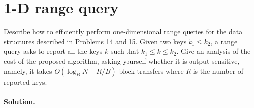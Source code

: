 \section{1-D range query}
Describe how to efficiently perform one-dimensional range queries for the data structures described in Problems 14 and 15. Given two keys $k_1 \leq k_2$, a range query asks to report all the keys $k$ such that $k_1 \leq k \leq k_2$. Give an analysis of the cost of the proposed algorithm, asking yourself whether it is output-sensitive, namely, it takes $O(\log_B N + R/B)$ block transfers where $R$ is the number of reported keys.

\vspace{0.5cm}
\paragraph{Solution.}